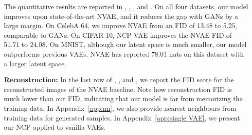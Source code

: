 \documentclass{article} \usepackage{iclr2021_conference,times}
\begin{document}
The quantitative results are reported in , , , and . On all four datasets, our model improves upon state-of-the-art NVAE, and it reduces the gap with GANs by a large margin.
On CelebA 64, we improve NVAE from an FID of 13.48 to 5.25, comparable to GANs. On CIFAR-10, NCP-VAE improves the NVAE  FID of 51.71 to 24.08. On MNIST, although our latent space is much smaller, our model outperforms previous VAEs. NVAE has reported 78.01 nats on this dataset with a larger latent space.


\textbf{Reconstruction:}  
In the last row of , , and , we report the FID score for the reconstructed images  of the  NVAE baseline. Note how reconstruction FID is much lower than our FID, indicating that our model is far from memorizing the training data. In Appendix~\ref{app:nn}, we also provide nearest neighbours from training data for generated samples. In Appendix~\ref{app:single VAE}, we present our NCP applied to vanilla VAEs.
\end{document}
